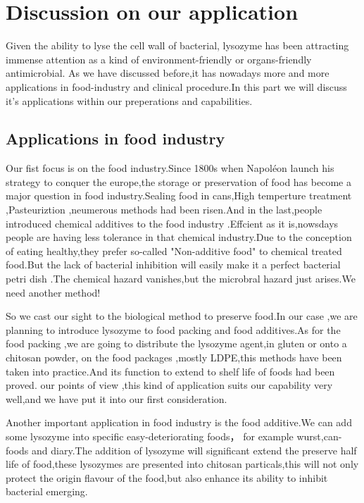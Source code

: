 \documentclass[a4paper,10pt]{article}
\begin{document}
    \section{Discussion on our application}
    Given the ability to lyse the cell wall of bacterial,
    lysozyme has been attracting immense attention as a kind of 
    environment-friendly or organs-friendly antimicrobial.
    As we have discussed before,it has nowadays more and more applications
    in food-industry and clinical procedure.In this part we will discuss 
    it's applications within our preperations and capabilities.
    \subsection{Applications in food industry}
    Our fist focus is on the food industry.Since 1800s when Napoléon launch his
    strategy to conquer the europe,the storage or preservation of food has become 
    a major question in food industry.Sealing food in cans,High temperture treatment
    ,Pasteuriztion ,neumerous methods had been risen.And in the last,people introduced
    chemical additives to the food industry .Effcient as it is,nowsdays people are having 
    less tolerance in that chemical industry.Due to the conception of eating healthy,they prefer
    so-called "Non-additive food" to chemical treated food.But the lack of bacterial inhibition
    will easily make it a perfect bacterial petri dish .The chemical hazard vanishes,but the microbral
    hazard just arises.We need another method!
    
    So we cast our sight to the biological method to preserve food.In our case ,we are planning to 
    introduce lysozyme to food packing and food additives.As for the food packing ,we are going to
    distribute the lysozyme agent,in gluten\citep{Conte2006} or onto a chitosan powder, on the food packages ,mostly LDPE,this methods have been taken into 
    practice\citep{Borzooeian2017}.And its function to extend to shelf life of foods had been proved.\citep{Lian2012,Alhazmi2014} our points of
    view ,this kind of application suits our capability very well,and we have put it into our first consideration.

    Another important application in food industry is the food additive.We can add some lysozyme into specific easy-deteriorating foods，
    for example wurst,can-foods and diary.The addition of lysozyme will significant extend the preserve half life of food,these lysozymes are
    presented into chitosan particals\citep{Wu2017},this will not only protect the origin flavour of the food,but also enhance its ability to inhibit 
    bacterial emerging.
\end{document}
